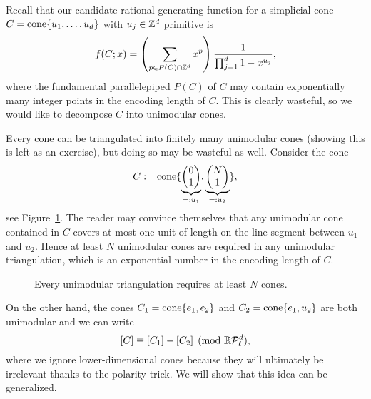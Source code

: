 Recall that our candidate rational generating function for a simplicial cone
$C = \operatorname{cone}\{u_1, \ldots, u_d \}$ with $u_j \in \mathbb{Z}^d$ primitive is
\[
  f(C;x) = \left(\sum_{p \in P(C) \cap \mathbb{Z}^d} x^p \right) \frac{1}{\prod_{j=1}^d 1 - x^{u_j}},
\]
where the fundamental parallelepiped $P(C)$ of $C$ may contain exponentially many integer points
in the encoding length of $C$.
This is clearly wasteful, so we would like to decompose $C$ into unimodular cones.

Every cone can be triangulated into finitely many unimodular cones (showing this is left as an exercise),
but doing so may be wasteful as well.
Consider the cone
\[
  C := \operatorname{cone}\{ \underbrace{\begin{pmatrix} 0 \\ 1 \end{pmatrix}}_{=: u_1}, \underbrace{\begin{pmatrix} N \\ 1 \end{pmatrix}}_{=: u_2} \},
\]
see Figure~\ref{fig:cone-bad-unimodular-triangulation}.
The reader may convince themselves that any unimodular cone contained in $C$
covers at most one unit of length on the line segment between $u_1$ and $u_2$.
Hence at least $N$ unimodular cones are required in any unimodular triangulation,
which is an exponential number in the encoding length of $C$.
\begin{figure}
  \begin{center}
  \end{center}
  \caption{Every unimodular triangulation requires at least $N$ cones.}
  \label{fig:cone-bad-unimodular-triangulation}
\end{figure}

On the other hand,
the cones $C_1 = \operatorname{cone}\{ e_1, e_2 \}$ and $C_2 = \operatorname{cone}\{ e_1, u_2 \}$ are both unimodular
and we can write
\[
  [C] \equiv [C_1] - [C_2] \pmod{\mathbb{R}\mathcal{P}_\ell^d},
\]
where we ignore lower-dimensional cones because they will ultimately be irrelevant thanks to the polarity trick.
We will show that this idea can be generalized.

